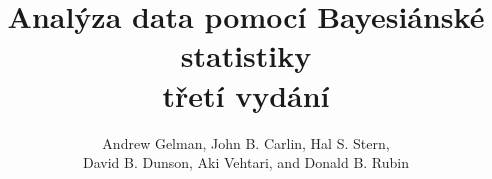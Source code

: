 \documentclass[a4paper]{book}
\begin{document}
\newtheorem{definition}{Definice}[chapter]
\newtheorem{theorem}{Věta}[chapter]
\newtheorem{proof}{Důkaz}[chapter]
\newtheorem{example}{Příklad}[chapter]
\newtheorem{corollary}{Tvrzení}[chapter]
\newtheorem{assumption}{Předpoklad}[chapter]


\title{Analýza data pomocí Bayesiánské statistiky\\třetí vydání}
\author{Andrew Gelman, John B. Carlin, Hal S. Stern,\\David B. Dunson, Aki Vehtari, and Donald B. Rubin}
\maketitle

\tableofcontents








\end{document}
